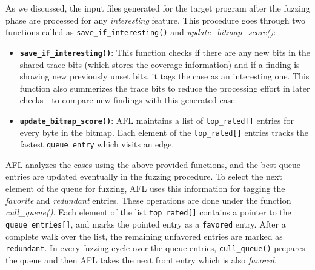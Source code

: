 As we discussed, the input files generated for the target program after the fuzzing phase are processed for any \textit{interesting} feature. This procedure goes through two functions called as \texttt{save\_if\_interesting()} and \textit{update\_bitmap\_score()}:

\begin{itemize}
    \item \textbf{\texttt{save\_if\_interesting()}}: This function checks if there are any new bits in the shared trace bits (which stores the coverage information) and if a finding is showing new previously unset bits, it tags the case as an interesting one. This function also summerizes the trace bits to reduce the processing effort in later checks - to compare new findings with this generated case.

    \item \textbf{\texttt{update\_bitmap\_score()}}: AFL maintains a list of \texttt{top\_rated[]} entries for every byte in the bitmap. Each element of the \texttt{top\_rated[]} entries tracks the fastest \texttt{queue\_entry} which visits an edge.
\end{itemize}

AFL analyzes the cases using the above provided functions, and the best queue entries are updated eventually in the fuzzing procedure. To select the next element of the queue for fuzzing, AFL uses this information for tagging the \textit{favorite} and \textit{redundant} entries. These operations are done under the function \textit{cull\_queue()}. Each element of the list \texttt{top\_rated[]} contains a pointer to the \texttt{queue\_entries[]}, and marks the pointed entry as a \texttt{favored} entry. After a complete walk over the list, the remaining unfavored entries are marked as \texttt{redundant}. In every fuzzing cycle over the queue entries, \texttt{cull\_queue()} prepares the queue and then AFL takes the next front entry which is also \textit{favored}.



